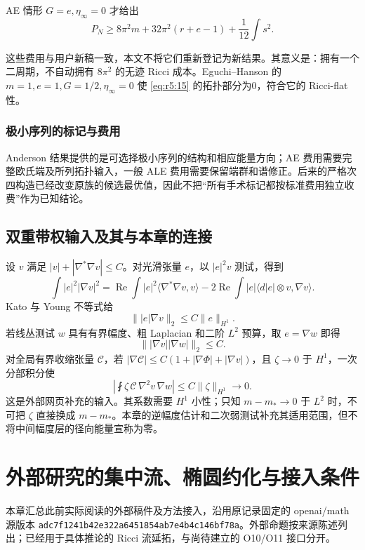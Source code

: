 \documentclass[UTF8,11pt,openany,oneside,fontset=none]{ctexbook}
\begin{document}
AE 情形 \(G=e,\eta_\infty=0\) 才给出 \[
 P_N\ge8\pi^2m+32\pi^2(r+e-1)+\frac1{12}\int s^2.
\tag{5.16}\label{eq:r5:16}
\]

这些费用与用户新稿一致，本文不将它们重新登记为新结果。其意义是：拥有一个二周期，不自动拥有 \(8\pi^2\) 的无迹 Ricci 成本。Eguchi--Hanson 的 \(m=1,e=1,G=1/2,\eta_\infty=0\) 使 \eqref{eq:r5:15} 的拓扑部分为0，符合它的 Ricci-flat 性。

\subsection{极小序列的标记与费用}\label{ch5:ux6781ux5c0fux5e8fux5217ux7684ux6807ux8bb0ux4e0eux8d39ux7528}

Anderson 结果提供的是可选择极小序列的结构和相应能量方向；AE 费用需要完整欧氏端及所列拓扑输入，一般 ALE 费用需要保留端群和谱修正。后来的严格次四构造已经改变原族的候选最优值，因此不把``所有手术标记都按标准费用独立收费''作为已知结论。\cite{System}

\section{双重带权输入及其与本章的连接}\label{ch5:ux53ccux91cdux5e26ux6743ux8f93ux5165ux53caux5176ux4e0eux672cux7ae0ux7684ux8fdeux63a5}

设 \(v\) 满足 \(|v|+|\nabla^*\nabla v|\le C\)。对光滑张量 \(e\)，以 \(|e|^2v\) 测试，得到 \[
\int|e|^2|\nabla v|^2
=\operatorname{Re}\int|e|^2\langle\nabla^*\nabla v,v\rangle
-2\operatorname{Re}\int |e|\langle d|e|\otimes v,\nabla v\rangle.
\] Kato 与 Young 不等式给 \[
\||e|\nabla v\|_2\le C\|e\|_{H^1}.
\] 若线丛测试 \(w\) 具有有界幅度、粗 Laplacian 和二阶 \(L^2\) 预算，取 \(e=\nabla w\) 即得 \[
\||\nabla v||\nabla w|\|_2\le C.
\] 对全局有界收缩张量 \(\mathcal C\)，若 \(|\nabla\mathcal C|\le C(1+|\nabla\Phi|+|\nabla v|)\)，且 \(\zeta\to0\) 于 \(H^1\)，一次分部积分使 \[
\left|\fint\zeta\,\mathcal C\,\nabla^2v\,\nabla w\right|
\le C\|\zeta\|_{H^1}\to0.
\] 这是外部网页补充的输入。其系数需要 \(H^1\) 小性；只知 \(m-m_*\to0\) 于 \(L^2\) 时，不可把 \(\zeta\) 直接换成 \(m-m_*\)。本章的逆幅度估计和二次弱测试补充其适用范围，但不将中间幅度层的径向能量宣称为零。\cite{Weighted}


\chapter{外部研究的集中流、椭圆约化与接入条件}\label{chapter:6}
本章汇总此前实际阅读的外部稿件及方法接入，沿用原记录固定的 openai/math 源版本 \texttt{adc7f1241b42e322a6451854ab7e4b4c146bf78a}。外部命题按来源陈述列出；已经用于具体推论的 Ricci 流延拓，与尚待建立的 O10/O11 接口分开。\cite{R06,R07}
\end{document}
